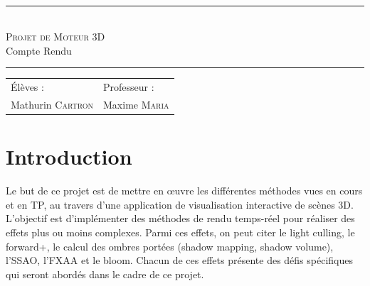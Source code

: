 \documentclass[10pt,a4paper]{article}
\author{\me}
\title{\titre}
\date{\today}
\newcommand{\HRule}{\rule{\linewidth}{0.5mm}}
\newcommand{\me}{Mathurin \textsc{Cartron}}
\newcommand{\prof}{Maxime \textsc{Maria}}
\newcommand{\matiere}{Moteur 3D}
\newcommand{\Cusrus}{Master ISICG/CRYPTIS}
\newcommand{\Prog}{Semestre 1}
\newcommand{\titre}{Projet de \matiere}
\newcommand{\soustitre}{Compte Rendu}
\begin{document}
%
%

	\begin{titlepage}
		\enlargethispage{2cm}
		\begin{center}
			\\
			\vspace*{1cm}
			\HRule\\
				\vspace*{.5cm}
				\textsc{\LARGE{\titre}}\\
				\vspace*{.7cm}
				\Large{\soustitre}\\
				\vspace*{.2cm}
			\HRule
			\vspace*{.7cm}
			\begin{tabular}{D{7cm} G{7cm}}
				Élèves :  	&  Professeur : \\
				\me 		&  \prof  \\
			\end{tabular}
		\end{center}
		\vspace*{.7cm}
		\begin{multicols}{2}
			\tableofcontents
			\listoftables
			\listoffigures
			\lstlistoflistings
		\end{multicols}
		\vspace*{4cm}
	\end{titlepage}

\ClearShipoutPicture

%
%

\section{Introduction}
	Le but de ce projet est de mettre en œuvre les différentes méthodes vues en cours et en TP, au travers d'une application de visualisation interactive de scènes 3D. L'objectif est d'implémenter des méthodes de rendu temps-réel pour réaliser des effets plus ou moins complexes. Parmi ces effets, on peut citer le light culling, le forward+, le calcul des ombres portées (shadow mapping, shadow volume), l'SSAO, l'FXAA et le bloom. Chacun de ces effets présente des défis spécifiques qui seront abordés dans le cadre de ce projet.
\end{document}
